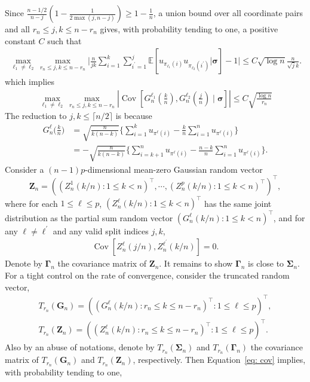 \documentclass[10pt]{article}
\def\bG{\mathbf{G}}
\def\bZ{\mathbf{Z}}
\def\bsigma{\boldsymbol{\sigma}}
\def\bSigma{\boldsymbol{\Sigma}}
\def\bGamma{\boldsymbol{\Gamma}}
\def\E{\mathbb{E}}
\theoremstyle{definition}
\theoremstyle{remark}
\begin{document}
Since $\frac{n - 1/2}{n - j}(1 - \frac{1}{2 \max(j,n-j)}) \geq 1 - \frac{1}{n}$, a union bound over all coordinate pairs and all $r_n \leq j,k \leq n-r_n$ gives, with probability tending to one, a positive constant $C$ such that
\begin{align*}
    \max_{\ell_1\neq \ell_2}
    \max_{r_n \leq j,k \leq n-r_n}
    \bigg|\frac{n}{jk}\sum_{i = 1}^k \sum_{i^\prime = 1}^j \E[u_{\pi_{\ell_1}(i)} u_{\pi_{\ell_2}(i^{\prime})}|\bsigma] - 1\bigg|
    \leq C\sqrt{\log n}\frac{n}{\sqrt{j}k}.
\end{align*}
which implies
\begin{align}\label{eq: cov}
    \max_{\ell_1\neq \ell_2}
    \max_{r_n \leq j,k \leq n-r_n}
    |\operatorname{Cov} [G_n^{\ell_1}(\frac{k}{n}), G_n^{\ell_2}(\frac{j}{n})\mid\bsigma]|
    \leq C\sqrt{\frac{\log n}{r_n}}
\end{align}
The reduction to $j,k \leq \lceil n/2 \rceil$ is because 
\begin{align*}
    G_n^\ell\bigg(\frac{k}{n}\bigg) & = \sqrt{\frac{n}{k(n-k)}} \bigg\{\sum_{i = 1}^k u_{\pi^\ell(i)} - \frac{k}{n} \sum_{i = 1}^n u_{\pi^\ell(i)} \bigg\} \\
    & = - \sqrt{\frac{n}{k(n-k)}} \bigg\{\sum_{i = k+1}^n u_{\pi^\ell(i)} - \frac{n-k}{n} \sum_{i = 1}^n u_{\pi^\ell(i)} \bigg\}.
\end{align*}
Consider a $(n-1)p$-dimensional mean-zero Gaussian random vector $$\bZ_n = ((Z_n^1(k/n):1\leq k<n)^\top, \cdots, (Z_n^p(k/n):1\leq k<n)^\top)^\top,$$ where for each $1 \leq \ell \leq p$, $(Z_n^\ell(k/n):1\leq k<n)^\top$ has the same joint distribution as the partial sum random vector $(G_n^\ell(k/n):1\leq k<n)^\top$, and for any $\ell \neq \ell^{\prime}$ and any valid split indices $j,k$,
\begin{align*}  
    \operatorname{Cov}[Z_n^\ell(j/n),Z_n^{\ell^{\prime}}(k/n)] = 0.
\end{align*}
Denote by $\bGamma_n$ the covariance matrix of $\bZ_n$. It remains to show $\bGamma_n$ is close to $\bSigma_n$. For a tight control on the rate of convergence, consider the truncated random vector,
\begin{align*}
    T_{r_n}(\bG_n) = ((G_n^\ell(k/n): r_n \leq k \leq n - r_n)^\top: 1 \leq \ell \leq p)^\top, \\
    T_{r_n}(\bZ_n) = ((Z_n^\ell(k/n): r_n \leq k \leq n - r_n)^\top: 1 \leq \ell \leq p)^\top.
\end{align*}
Also by an abuse of notations, denote by $T_{r_n}(\bSigma_n)$ and $T_{r_n}(\bGamma_n)$ the covariance matrix of $T_{r_n}(\bG_n)$ and $T_{r_n}(\bZ_n)$, respectively. Then Equation~\eqref{eq: cov} implies, with probability tending to one,
\end{document}
